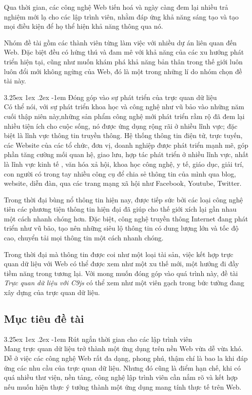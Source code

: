 \documentclass[12pt,a4paper]{article}
\makeatletter
\newcommand{\myparagraph}[1]{\paragraph{#1}\mbox{}\\} %
\renewcommand\paragraph{\@startsection{paragraph}{5}{\z@}%
  {3.25ex \@plus1ex \@minus.2ex}%
  {-1em}%
  {\normalfont\normalsize\bfseries}}
\makeatother
\begin{document}
Qua thời gian, các công nghệ Web tiến hoá và ngày càng đem lại nhiều trả nghiệm mới lạ cho các lập trình viên, nhằm đáp ứng khả năng sáng tạo và tạo mọi điều kiện để họ thể hiện khả năng thông qua nó. 

Nhóm đề tài gồm các thành viên từng làm việc với nhiều dự án liên quan đến Web. Đặc biệt đều có hứng thú và đam mê với khả năng của các xu hướng phát triển hiện tại, cũng như muốn khám phá khả năng bản thân trong thế giới luôn luôn đổi mới không ngừng của Web, đó là một trong những lí do nhóm chọn đề tài này.

\myparagraph{Đóng góp vào sự phát triển của trực quan dữ liệu}
\cite{technology_boom} Có thể nói, với sự phát triển khoa học và công nghệ như vũ bảo vào những năm cuối thập niên này,những sản phẩm công nghệ  mới phát triển rầm rộ đã đem lại nhiều tiện ích cho cuộc sống, nó được ứng dụng rộng rãi ở nhiều lĩnh vực; đặc biệt là lĩnh vực thông tin truyền thông. Hệ thống thông tin điện tử, trực tuyến, các Website của các tổ chức, đơn vị, doanh nghiệp được phát triển mạnh mẽ, góp phần tăng cường mối quan hệ, giao lưu, hợp tác phát triển ở nhiều lĩnh vực, nhất là lĩnh vực kinh tế , văn hóa xả hội, khoa học công nghệ, y tế, giáo dục, giải trí, con người có trong tay nhiều công cụ để chia sẻ thông tin của mình qua blog, website, diễn đàn, qua  các trang mạng xã hội như Facebook, Youtube, Twitter.

Trong thời đại bùng nổ thông tin hiện nay, được tiếp sức bởi các loại công nghệ tiên các phương tiện thông tin hiện đại đã giúp cho thế giới xích lại gần nhau một cách nhanh chóng hơn. Đặc biệt, công nghệ truyền thông Internet đang phát triển như vũ bão, tạo nên những siêu lộ thông tin có dung lượng lớn và tốc độ cao, chuyển tải mọi thông tin một cách nhanh chóng.

Trong thời đại mà thông tin được coi như một loại tài sản, việc kết hợp trực quan dữ liệu với Web có thể được xem như một xu thế mới, một hướng đi đầy tiềm năng trong tương lại. Với mong muốn đóng góp vào quá trình này, đề tài \textit{Trực quan dữ liệu với C9js} có thể xem như một viên gạch trong bức tường đang xây dựng của trực quan dữ liệu.
\subsection{Mục tiêu đề tài}
\myparagraph{Rút ngắn thời gian cho các lập trình viên}
Mang trực quan dữ liệu trở thành một ứng dụng trên nền Web vừa dễ vừa khó. Dễ ở việc các công nghệ Web rất đa dạng, phong phú, thậm chí là bao la khi đáp ứng các nhu cầu của trực quan dữ liệu. Nhưng đó cũng là điểm hạn chế, khi có quá nhiều thư viện, nền tảng, công nghệ lập trình viên cần nắm rõ và kết hợp nếu muốn hiện thực ý tưởng thành một ứng dụng mang tính thực tế trên Web.
\end{document}
